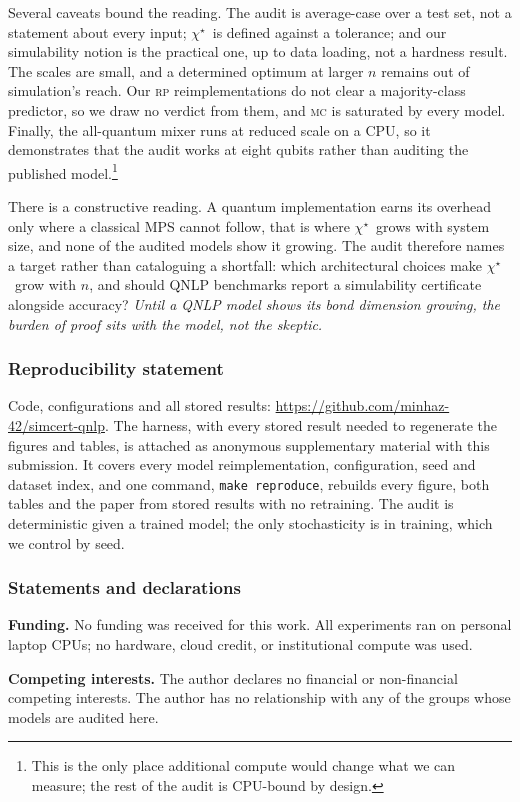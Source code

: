 \documentclass[10pt]{article}
\makeatletter
\newcommand{\chistar}{\ensuremath{\chi^\star}}
\newcommand{\repoavailability}{%
  \if@preprint
    Code, configurations and all stored results:
    \url{https://github.com/minhaz-42/simcert-qnlp}.%
  \else
    The harness, with every stored result needed to regenerate the figures and tables, is
    attached as anonymous supplementary material with this submission.%
  \fi}
\makeatother
\begin{document}
Several caveats bound the reading. The audit is average-case over a test set, not a statement about
every input; \chistar\ is defined against a tolerance; and our simulability notion is the
practical one, up to data loading, not a hardness result. The scales are small, and a determined optimum at larger $n$ remains out of
simulation's reach. Our \textsc{rp} reimplementations do not clear a majority-class predictor, so
we draw no verdict from them, and \textsc{mc} is saturated by every model. Finally, the all-quantum mixer runs at reduced scale on a CPU, so it demonstrates that the
audit works at eight qubits rather than auditing the published model.\footnote{This is the only place
additional compute would change what we can measure; the rest of the audit is CPU-bound by design.}

There is a constructive reading. A quantum implementation earns its overhead only where a classical
MPS cannot follow, that is where \chistar\ grows with system size, and none of the audited models
show it growing. The audit therefore names a target rather than cataloguing a shortfall: which
architectural choices make \chistar\ grow with $n$, and should QNLP benchmarks report a
simulability certificate alongside accuracy? \emph{Until a QNLP model shows its bond dimension
growing, the burden of proof sits with the model, not the skeptic.}

\subsubsection*{Reproducibility statement}
\repoavailability{} It covers every model reimplementation, configuration, seed and dataset
index, and one command, \texttt{make reproduce}, rebuilds every figure, both tables and the paper
from stored results with no retraining. The audit is deterministic given a trained model; the only
stochasticity is in training, which we control by seed.

\subsubsection*{Statements and declarations}
\textbf{Funding.} No funding was received for this work. All experiments ran on personal laptop
CPUs; no hardware, cloud credit, or institutional compute was used.

\textbf{Competing interests.} The author declares no financial or non-financial competing
interests. The author has no relationship with any of the groups whose models are audited here.
\end{document}
